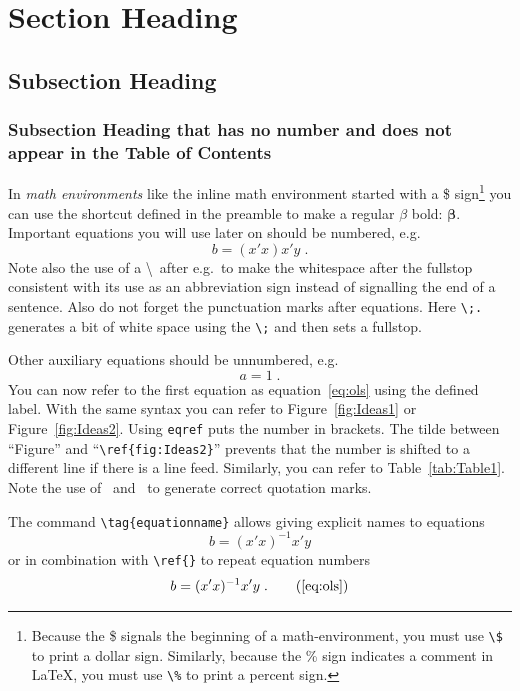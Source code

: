 \documentclass[a4paper,12pt]{scrartcl} %
\newcommand{\bs}{\boldsymbol}  %
\begin{document}
\section{Section Heading} \label{sec:Section1}


\subsection{Subsection Heading}

\subsubsection*{Subsection Heading that has no number and does not appear in the Table of Contents}


In \emph{math environments} like the inline math environment started with a \$ sign\footnote{Because the \$ signals the beginning of a math-environment, you must use \texttt{\textbackslash\$} to print a dollar sign. Similarly, because the \% sign indicates a comment in \LaTeX, you must use \texttt{\textbackslash\%} to print a percent sign.} you can use the shortcut defined in the preamble to make a regular $\beta$ bold: $\bs \beta$. Important equations you will use later on should be numbered, e.g.\
\begin{equation}\label{eq:ols}
   b = (x'x)x'y \;.
\end{equation}
Note also the use of a \textbackslash\ after e.g.\ to make the whitespace after the fullstop consistent with its use as an abbreviation sign instead of signalling the end of a sentence. Also do not forget the punctuation marks after equations. Here \verb|\;.| generates a bit of white space using the \verb|\;| and then sets a fullstop.

Other auxiliary equations should be unnumbered, e.g.\
\begin{equation*}
   a = 1\;.
\end{equation*}
You can now refer to the first equation as equation~\eqref{eq:ols} using the defined label. With the same syntax you can refer to Figure~\ref{fig:Ideas1} or Figure~\ref{fig:Ideas2}. Using \texttt{eqref} puts the number in brackets. The tilde between ``Figure'' and  ``\verb|\ref{fig:Ideas2}|'' prevents that the number is shifted to a different line if there is a line feed. Similarly, you can refer to Table~\ref{tab:Table1}. Note the use of \textasciigrave\textasciigrave\ and \textquotesingle\textquotesingle\ to generate correct quotation marks.

The command \verb|\tag{equationname}| allows giving explicit names to equations
\begin{equation}
   b = (x'x)^{-1}x'y  \tag{OLS Estimator}
\end{equation}
or in combination with \verb|\ref{}| to repeat equation numbers
\begin{equation}
   b = (x'x)^{-1}x'y \;. \tag{\ref{eq:ols}}
\end{equation}
\end{document}
